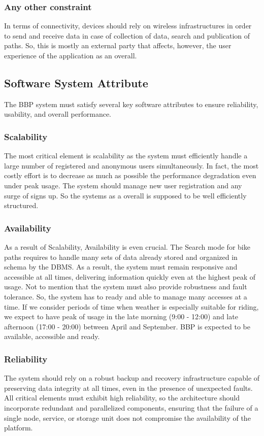 \subsubsection{Any other constraint}

In terms of connectivity, devices should rely on wireless infrastructures in order to send and receive data in case of collection of data, search and publication of paths. So, this is mostly an external party that affects, however, the user experience of the application as an overall. 

\subsection{Software System Attribute}
The BBP system must satisfy several key software attributes to ensure reliability, usability, and overall performance.     
\subsubsection{Scalability}
The most critical element is scalability as the system must efficiently handle a large number of registered and anonymous users simultaneously. In fact, the most costly effort is to decrease as much as possible the performance degradation even under peak usage. The system should manage new user registration and any surge of signs up. So the systems as a overall is supposed to be well efficiently structured.
\subsubsection{Availability}
As a result of Scalability, Availability is even crucial. The Search mode for bike paths requires to handle many sets of data already stored and organized in schema by the DBMS. As a result, the system must remain responsive and accessible at all times, delivering information quickly even at the highest peak of usage. Not to mention that the system must also provide robustness and fault tolerance. So, the system has to ready and able to manage many accesses at a time. If we consider periods of time when weather is especially suitable for riding, we expect to have peak of usage in the late morning (9:00 - 12:00) and late afternoon (17:00 - 20:00) between April and September. BBP is expected to be available, accessible and ready.
\subsubsection{Reliability}
The system should rely on a robust backup and recovery infrastructure capable of preserving data integrity at all times, even in the presence of unexpected faults. All critical elements must exhibit high reliability, so the architecture should incorporate redundant and parallelized components, ensuring that the failure of a single node, service, or storage unit does not compromise the availability of the platform.
